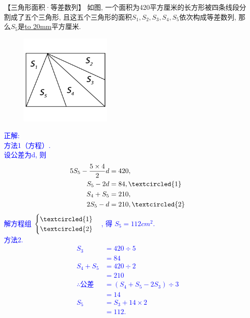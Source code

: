 \item {
    【三角形面积·等差数列】
    如图, 一个面积为420平方厘米的长方形被四条线段分割成了五个三角形, 且这五个三角形的面积$S_1, S_2, S_3, S_4, S_5$依次构成等差数列, 那么$S_5$是\underline{\hbox to 20mm{}}平方厘米.
    \begin{figure}[H] 
        \centering
        \includegraphics[width=0.4\textwidth]{./pics/Chapter_2/16.png}
    \end{figure}
    \ifshowSolution 
        \fangsong{}\textcolor{blue}{
            正解: \\
            方法1（方程）.\\
            设公差为d, 则 
            \begin{align*}
                5S_{5} - \frac{5\times 4}{2}d &= 420, \\
                S_{5} - 2d &= 84, \textcircled{1} \\
                S_{4} + S_{5} &= 210, \\
                2S_{5} - d &= 210, \textcircled{2} \\
            \end{align*}
            解方程组
                $\begin{cases}
                    \textcircled{1} \\ 
                    \textcircled{2}  
                \end{cases}$,
            得 $S_{5}=112 {cm}^2.$\\
            方法2.\\
            \begin{align*}
                S_{3} &= 420\div 5 \\
                &= 84 \\
                S_{4} + S_{5} &= 420\div 2\\
                &=210 \\
                \therefore 公差 &= (S_{4} + S_{5} - 2S_{3})\div 3\\
                &= 14\\
                S_{5} &= S_{3} + 14\times 2 \\
                &= 112.
            \end{align*}
        }
    \else
        \vspace{1cm}
    \fi
}

